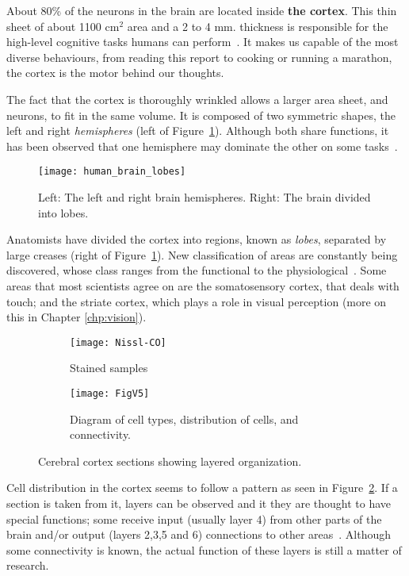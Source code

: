 About 80\% of the neurons in the brain are located inside \textbf{the cortex}. This thin sheet of about 1100 cm$^2$ area and a 2 to 4 mm. thickness is responsible for the high-level cognitive tasks humans can perform~\cite{thompson2000brain}. It makes us capable of the most diverse behaviours, from reading this report to cooking or running a marathon, the cortex is the motor behind our thoughts. 

The fact that the cortex is thoroughly wrinkled allows a larger area sheet, and neurons, to fit in the same volume. It is composed of two symmetric shapes, the left and right \emph{hemispheres} (left of Figure~\ref{fig:brain:hemi-lobes}). Although both share functions, it has been observed that one hemisphere may dominate the other on some tasks~\cite{lateralization}. 

\begin{figure}[hbt]
  \begin{center}
    \texttt{[image: human\_brain\_lobes]}
    \caption{Left: The left and right brain hemispheres. Right: The brain divided into lobes.}
    \label{fig:brain:hemi-lobes}
  \end{center}
\end{figure}

Anatomists have divided the cortex into regions, known as \emph{lobes},  separated by large creases (right of Figure~\ref{fig:brain:hemi-lobes}). New classification of areas are constantly being discovered, whose class ranges from the functional to the physiological~\cite{eye-brain-vision-hubel1995}. Some areas that most scientists agree on are the somatosensory cortex, that deals with touch; and the striate cortex, which plays a role in visual perception (more on this in Chapter \ref{chp:vision}).

\begin{figure}[ht]
  \begin{center}
    \begin{subfigure}{0.4\textwidth}
      \texttt{[image: Nissl-CO]}
      \caption{Stained samples}
    \end{subfigure}
    \begin{subfigure}{0.4\textwidth}
      \texttt{[image: FigV5]}
      \caption{Diagram of cell types, distribution of cells, and connectivity.}
    \end{subfigure}
    \caption{Cerebral cortex sections showing layered organization.}
    \label{fig:neuro:cortex-layers}
  \end{center}
\end{figure}

Cell distribution in the cortex seems to follow a pattern as seen in Figure~\ref{fig:neuro:cortex-layers}. If a section is taken from it,  layers can be observed and it they are thought to have special functions; some  receive input (usually layer 4) from other parts of the brain and/or output (layers 2,3,5 and 6) connections to other areas~\cite{thompson2000brain,eye-brain-vision-hubel1995}. Although some connectivity is known, the actual function of these layers is still a matter of research.